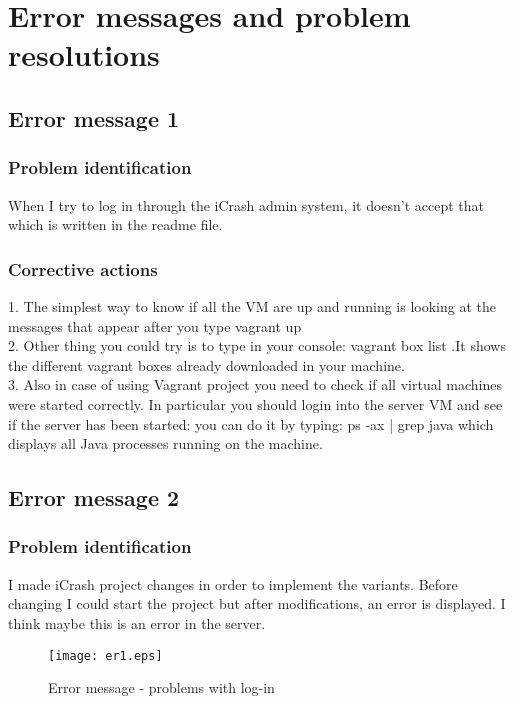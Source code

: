 
\chapter{Error messages and problem resolutions}
\label{chap:error_messages}

\section{Error message 1}

\subsection{Problem identification}
When I try to log in through the iCrash admin system, it doesn't accept that
which is written in the readme file.

\subsection{Corrective actions}
1. The simplest way to know if all the VM are up and running is looking at the
messages that appear after you type vagrant up \\
2. Other thing you could try is to type in your console: vagrant box list .It
shows the different vagrant boxes already downloaded in your machine.\\
3. Also in case of using Vagrant project you need to check if all virtual
machines were started correctly. In particular you should login into the server VM and see if the server has been started: you can do it by typing:  ps -ax | grep java which displays all Java processes running on the machine.



\section{Error message 2}

\subsection{Problem identification}
I made iCrash project changes in order to implement the variants. Before
changing I could start the project but after modifications, an error is
displayed. I think maybe this is an error in the server.\\

\begin{figure}
\begin{center}
\texttt{[image: er1.eps]}
\end{center}
\caption{Error message - problems with log-in}
\end{figure}

